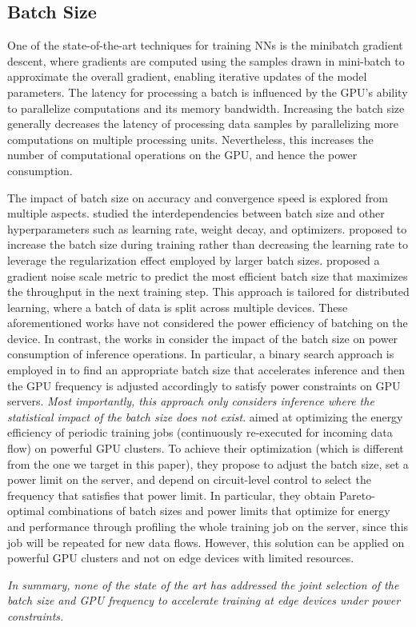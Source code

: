 \subsection{Batch Size} 
One of the state-of-the-art techniques for training \acp{NN} is the minibatch gradient descent, where gradients are computed using the samples drawn in mini-batch to approximate the overall gradient, enabling iterative updates of the model parameters. 
The latency for processing a batch is influenced by the GPU's ability to parallelize computations and its memory bandwidth. 
Increasing the batch size generally decreases the latency of processing data samples by parallelizing more computations on multiple processing units. 
Nevertheless, this increases the number of computational operations on the GPU, and hence the power consumption. 

The impact of batch size on accuracy and convergence speed is explored from multiple aspects. \cite{goyal2017accurate, krizhevsky2014one, batch_size_and_optimizers} studied the interdependencies between batch size and other hyperparameters such as learning rate, weight decay, and optimizers. 
\cite{incraese_bs_training}  proposed to increase the batch size during training rather than decreasing the learning rate to leverage the regularization effect employed by larger batch sizes.  \cite{large_batch_size_training} proposed a gradient noise scale metric to predict the most efficient batch size that maximizes the throughput in the next training step. This approach is tailored for distributed learning, where a batch of data is split across multiple devices.
These aforementioned works have not considered the power efficiency of batching on the device. 
%
In contrast, the works in \cite{batch_sizer_inference,batch_dvfs_inference} consider the impact of the batch size on power consumption of inference operations. In particular, a binary search approach is employed in \cite{batch_dvfs_inference} to find an appropriate batch size that accelerates inference and then the GPU frequency is adjusted accordingly to satisfy power constraints on GPU servers. \textit{Most importantly, this approach only considers inference where the statistical impact of the batch size does not exist}.
\cite{zeus} aimed at optimizing the energy efficiency of periodic training jobs (continuously re-executed for incoming data flow) on powerful GPU clusters. To achieve their optimization (which is different from the one we target in this paper), they propose to adjust the batch size, set a power limit on the server, and depend on circuit-level control to select the frequency that satisfies that power limit.
In particular, they obtain Pareto-optimal combinations of batch sizes and power limits that optimize for energy and performance through profiling the whole training job on the server, since this job will be repeated for new data flows. However, this solution can be applied on powerful GPU clusters and not on edge devices with limited resources. 

\textit{
In summary, none of the state of the art has addressed the joint selection of the batch size and GPU frequency to accelerate training at edge devices under power constraints.} 


